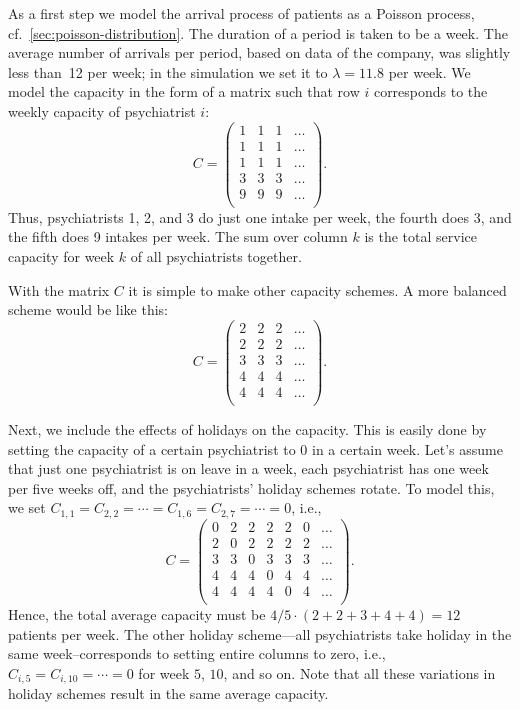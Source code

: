 As a first step we model the arrival process of patients as a Poisson process, cf.~\cref{sec:poisson-distribution}.
The duration of a period is taken to be a week.
The average number of arrivals per period, based on data of the company, was slightly less than~12 per week; in the simulation we set it to $\lambda= 11.8$ per week.
We model the capacity in the form of a matrix such that row $i$ corresponds to the weekly capacity of psychiatrist $i$:
\begin{equation*}
C = 
  \begin{pmatrix}
    1 & 1 & 1 & \ldots\\
    1 & 1 & 1 & \ldots\\
    1 & 1 & 1 & \ldots\\
    3 & 3 & 3 & \ldots\\
    9 & 9 & 9 & \ldots\\
  \end{pmatrix}.
\end{equation*}
Thus, psychiatrists 1, 2, and 3 do just one intake per week, the
fourth does 3, and the fifth does 9 intakes per week. The sum over
column $k$ is the total service capacity for week $k$ of all
psychiatrists together.

With the matrix $C$ it is simple to make other capacity schemes. A
more balanced scheme would be like this:
\begin{equation*}
C = 
  \begin{pmatrix}
    2 & 2 & 2 & \ldots\\
    2 & 2 & 2 & \ldots\\
    3 & 3 & 3 & \ldots\\
    4 & 4 & 4 & \ldots\\
    4 & 4 & 4 & \ldots\\
  \end{pmatrix}.
\end{equation*}

Next, we include the effects of holidays on the capacity. This is
easily done by setting the capacity of a certain psychiatrist to 0 in
a certain week. Let's assume that just one psychiatrist is on leave in
a week, each psychiatrist has one week per five weeks off, and the
psychiatrists' holiday schemes rotate. To model this, we set
$C_{1,1}=C_{2,2}=\cdots=C_{1,6}=C_{2,7} =\cdots = 0$, i.e.,
\begin{equation*}
C = 
  \begin{pmatrix}
    0 & 2 & 2 & 2 & 2 & 0 & \ldots \\
    2 & 0 & 2 & 2 & 2 & 2 & \ldots\\
    3 & 3 & 0 & 3 & 3 & 3 & \ldots\\
    4 & 4 & 4 & 0 & 4 & 4 & \ldots\\
    4 & 4 & 4 & 4 & 0 & 4 & \ldots\\
  \end{pmatrix}.
\end{equation*}
Hence, the total average capacity must be $4/5 \cdot (2+2+3+4+4) = 12$
patients per week.  The other holiday scheme---all psychiatrists take
holiday in the same week--corresponds to setting entire columns to
zero, i.e., $C_{i,5}=C_{i,10}=\cdots=0$ for week $5$, $10$, and so
on. Note that all these variations in holiday schemes result in the
same average capacity.

